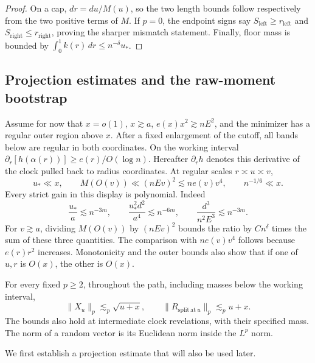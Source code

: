 \begin{proof}
On a cap, $dr=du/M(u)$, so the two length bounds follow respectively
from the two positive terms of $M$.  If $p=0$, the endpoint signs say
$S_{\mathrm{left}}\ge r_{\mathrm{left}}$ and
$S_{\mathrm{right}}\le r_{\mathrm{right}}$, proving the sharper
mismatch statement.  Finally, floor mass is bounded by
$\int_0^1 k(r)\,dr\le n^{-\delta}u_*$.
\end{proof}

\subsection{Projection estimates and the raw-moment bootstrap}

Assume for now that $x=o(1)$, $x\gtrsim a$,
$e(x)x^2\gtrsim nE^2$, and the minimizer has a regular outer region
above $x$.  After a fixed enlargement of the cutoff, all bands below
are regular in both coordinates.  On the working interval
$\partial_r[h(\alpha(r))]\ge e(r)/O(\log n)$.
Hereafter $\partial_r h$ denotes this derivative of the clock pulled
back to radius coordinates. At regular scales $r\asymp u\asymp v$,
\begin{equation}
 u_*\ll x,\qquad
 M(O(v))\ll(nEv)^2\lesssim n e(v)v^4,
 \qquad n^{-1/6}\ll x.
 \tag{11}\label{eq:11}
\end{equation}
Every strict gain in this display is polynomial.  Indeed
\[
 \frac{u_*}{a}\lesssim n^{-3m},\qquad
 \frac{u_*^2d^2}{a^4}\lesssim n^{-6m},\qquad
 \frac{d^3}{n^2E^3}\lesssim n^{-3m}.
\]
For $v\gtrsim a$, dividing $M(O(v))$ by $(nEv)^2$ bounds the ratio by
$Cn^\delta$ times the sum of these three quantities.
The comparison with $ne(v)v^4$ follows because $e(r)r^2$ increases.
Monotonicity and the outer bounds also show that if one of $u,r$ is
$O(x)$, the other is $O(x)$.

\begin{proposition}\label{comp:raw-moments}
For every fixed $p\ge2$, throughout the path, including masses below
the working interval,
\begin{equation}
 \|X_u\|_p\lesssim_p\sqrt{u+x},\qquad
 \|R_{\mathrm{split\ at}\ u}\|_p\lesssim_p u+x.
 \tag{12}\label{eq:12}
\end{equation}
The bounds also hold at intermediate clock revelations, with their
specified mass.  The norm of a random vector is its Euclidean norm
inside the $L^p$ norm.
\end{proposition}

We first establish a projection estimate that will also be used later.

